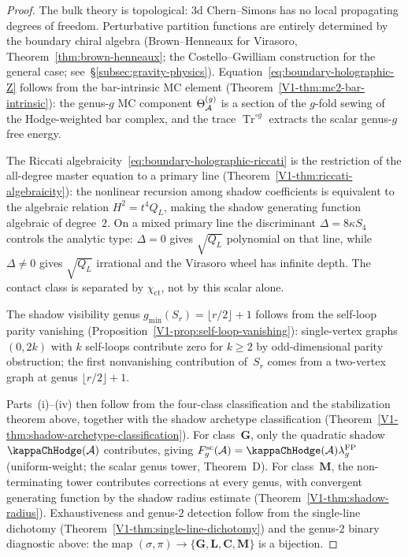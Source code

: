 \begin{proof}
The bulk theory is topological: $3$d Chern--Simons has no
local propagating degrees of freedom. Perturbative partition
functions are entirely determined by the boundary chiral
algebra (Brown--Henneaux for Virasoro,
Theorem~\ref{thm:brown-henneaux};
the Costello--Gwilliam construction for the general case;
see~\S\ref{subsec:gravity-physics}).
Equation~\eqref{eq:boundary-holographic-Z} follows from the
bar-intrinsic MC element
(Theorem~\ref*{V1-thm:mc2-bar-intrinsic}): the genus-$g$
MC component $\Theta_{\mathcal{A}}^{(g)}$ is a section of the
$g$-fold sewing of the Hodge-weighted bar complex, and the
trace $\operatorname{Tr}^{\circ g}$ extracts the scalar
genus-$g$ free energy.

The Riccati algebraicity~\eqref{eq:boundary-holographic-riccati}
is the restriction of the all-degree master equation to a primary
line
(Theorem~\ref*{V1-thm:riccati-algebraicity}): the nonlinear
recursion among shadow coefficients is equivalent to the
algebraic relation $H^2 = t^4 Q_L$, making the shadow
generating function algebraic of degree~$2$. On a mixed primary
line the discriminant $\Delta = 8\kappa S_4$ controls the analytic
type: $\Delta = 0$ gives $\sqrt{Q_L}$ polynomial on that line,
while $\Delta \neq 0$ gives $\sqrt{Q_L}$ irrational and the
Virasoro wheel has infinite depth.  The contact class is separated
by $\chi_{\mathrm{ct}}$, not by this scalar alone.

The shadow visibility genus
$g_{\min}(S_r) = \lfloor r/2 \rfloor + 1$ follows from the
self-loop parity vanishing
(Proposition~\ref*{V1-prop:self-loop-vanishing}): single-vertex
graphs $(0, 2k)$ with $k$ self-loops contribute zero for
$k \geq 2$ by odd-dimensional parity obstruction; the first
nonvanishing contribution of~$S_r$ comes from a two-vertex
graph at genus $\lfloor r/2 \rfloor + 1$.

Parts~(i)--(iv) then follow from the four-class classification
and the stabilization theorem above, together with the shadow
archetype classification
(Theorem~\ref*{V1-thm:shadow-archetype-classification}).
For class~$\mathbf{G}$, only the quadratic shadow
\(\kappaChHodge(\cA)\)
contributes, giving
$F_g^{\mathrm{sc}}(\cA)=\kappaChHodge(\cA)\lambda_g^{\mathrm{FP}}$
\textup{(}uniform-weight; the scalar genus tower, Theorem~D\textup{)}.
For class~$\mathbf{M}$, the non-terminating tower contributes
corrections at every genus, with convergent generating function
by the shadow radius estimate
(Theorem~\ref*{V1-thm:shadow-radius}).
Exhaustiveness and genus-$2$ detection follow from the
single-line dichotomy
(Theorem~\ref*{V1-thm:single-line-dichotomy})
and the genus-$2$ binary diagnostic above: the map
$(\sigma, \pi) \to \{\mathbf{G}, \mathbf{L},
\mathbf{C}, \mathbf{M}\}$ is a bijection.
\end{proof}


